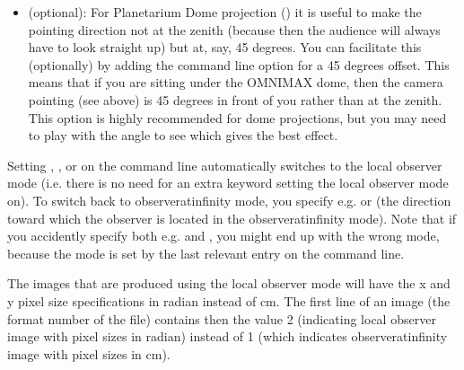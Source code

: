 \documentclass[letterpaper,10pt,english]{sphinxmanual}
\begin{document}
\begin{itemize}
\item {} 
 (optional):
For Planetarium Dome projection () it is
useful to make the pointing direction not at the zenith (because then the
audience will always have to look straight up) but at, say, 45 degrees. You
can facilitate this (optionally) by adding the command line option  for a 45 degrees offset. This means that if you are sitting under the
OMNIMAX dome, then the camera pointing (see  above) is 45 degrees
in front of you rather than at the zenith. This option is highly recommended
for dome projections, but you may need to play with the angle to see which
gives the best effect.

\end{itemize}

Setting , ,  or  on the
command line automatically switches to the local observer mode (i.e. there is no
need for an extra keyword setting the local observer mode on). To switch back to
observer\sphinxhyphen{}at\sphinxhyphen{}infinity mode, you specify e.g.  or  (the direction
toward which the observer is located in the observer\sphinxhyphen{}at\sphinxhyphen{}infinity mode). Note
that if you accidently specify both e.g.  and , you might
end up with the wrong mode, because the mode is set by the last relevant entry
on the command line.

The images that are produced using the local observer mode will have the x\sphinxhyphen{} and
y\sphinxhyphen{} pixel size specifications in radian instead of cm. The first line of an image
(the format number of the file) contains then the value 2 (indicating local
observer image with pixel sizes in radian) instead of 1 (which indicates
observer\sphinxhyphen{}at\sphinxhyphen{}infinity image with pixel sizes in cm).

\end{document}
